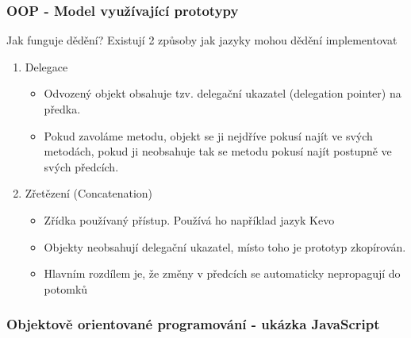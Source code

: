 \begin{frame}
    \frametitle{OOP - Model využívající prototypy}

    Jak funguje dědění?\break
    Existují 2 způsoby jak jazyky mohou dědění implementovat

    \begin{enumerate}
        \item Delegace \begin{itemize}
            \item Odvozený objekt obsahuje tzv. delegační ukazatel (delegation pointer) na předka.
            \item Pokud zavoláme metodu, objekt se ji nejdříve pokusí najít ve svých metodách, pokud ji neobsahuje tak se metodu pokusí najít postupně ve svých předcích.  
        \end{itemize}
        \item Zřetězení (Concatenation) \begin{itemize}
            \item Zřídka používaný přístup. Používá ho například jazyk Kevo
            \item Objekty neobsahují delegační ukazatel, místo toho je prototyp zkopírován.
            \item Hlavním rozdílem je, že změny v předcích se automaticky nepropagují do potomků
        \end{itemize}
    \end{enumerate}

\end{frame}


\begin{frame}
    \frametitle{Objektově orientované programování - ukázka JavaScript}


\end{frame}